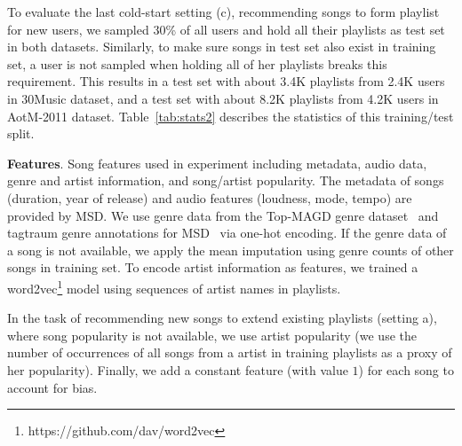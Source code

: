To evaluate the last cold-start setting (c), \ie recommending songs to form playlist for new users,
we sampled 30\% of all users and hold all their playlists as test set in both datasets.
Similarly, to make sure songs in test set also exist in training set,
a user is not sampled when holding all of her playlists breaks this requirement.
This results in a test set with about 3.4K playlists from 2.4K users in 30Music dataset,
and a test set with about 8.2K playlists from 4.2K users in AotM-2011 dataset.
Table~\ref{tab:stats2} describes the statistics of this training/test split.


{\bf Features}.
Song features used in experiment including metadata, audio data, genre and artist information, and song/artist popularity.
%
The metadata of songs (\eg duration, year of release) and audio features (\eg loudness, mode, tempo) are provided by MSD.
We use genre data from the Top-MAGD genre dataset~\cite{schindler2012facilitating}
and tagtraum genre annotations for MSD~\cite{schreiber2015improving} via one-hot encoding.
If the genre data of a song is not available, we apply the mean imputation using genre counts of other songs in training set.
To encode artist information as features,
we trained a word2vec\footnote{https://github.com/dav/word2vec} model using sequences of artist names in playlists.

In the task of recommending new songs to extend existing playlists (setting a), where song popularity is not available,
we use artist popularity (we use the number of occurrences of all songs from a artist in training playlists as a proxy of her popularity).
Finally, we add a constant feature (with value $1$) for each song to account for bias.


